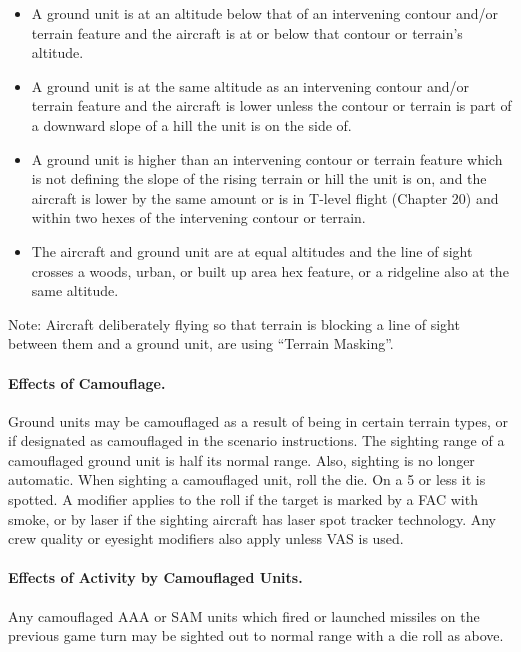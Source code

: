 \begin{itemize}

    \item A ground unit is at an altitude below that of an intervening contour and/or terrain feature and the aircraft is at or below that contour or terrain's altitude.

    \item A ground unit is at the same altitude as an intervening contour and/or terrain feature and the aircraft is lower unless the contour or terrain is part of a downward slope of a hill the unit is on the side of.

    \item A ground unit is higher than an intervening contour or terrain feature which is not defining the slope of the rising terrain or hill the unit is on, and the aircraft is lower by the same amount or is in T-level flight (Chapter 20) and within two hexes of the intervening contour or terrain.

    \item The aircraft and ground unit are at equal altitudes and the line of sight crosses a woods, urban, or built up area hex feature, or a ridgeline also at the same altitude.

\end{itemize}

Note: Aircraft deliberately flying so that terrain is blocking a line of sight between them and a ground unit, are using “Terrain Masking”.

\paragraph{Effects of Camouflage.} Ground units may be camouflaged as a result of being in certain terrain types, or if designated as camouflaged in the scenario instructions. The sighting range of a camouflaged ground unit is half its normal range. Also, sighting is no longer automatic. When sighting a camouflaged unit, roll the die. On a 5 or less it is spotted. A  modifier applies to the roll if the target is marked by a FAC with smoke, or by laser if the sighting aircraft has laser spot tracker technology. Any crew quality or eyesight modifiers also apply unless VAS is used.

\paragraph{Effects of Activity by Camouflaged Units.}  Any camouflaged AAA or SAM units which fired or launched missiles on the previous game turn may be sighted out to normal range with a die roll as above.

